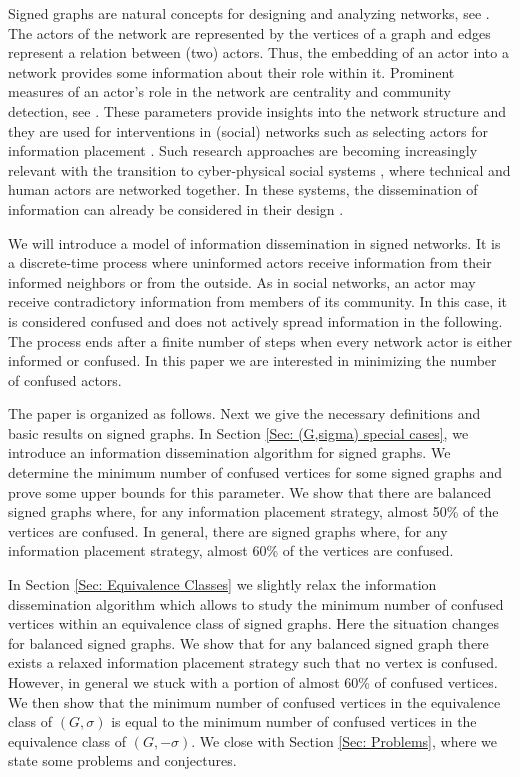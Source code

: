 \documentclass[a4paper,11pt]{article}
\theoremstyle{remark}
\begin{document}
Signed graphs are natural concepts for designing and analyzing networks, see \cite{leskovec2010signed}. 
The actors of the network are represented by the vertices of a graph and 
edges represent a relation between (two) actors. Thus, the embedding of an actor into a network provides some information about their role within it.
Prominent measures of an actor's role in the network are centrality and community detection, see \cite{bloch2023centrality, liu2020simple, sun2020stable}.
These parameters provide insights into the network structure and they are used for 
interventions in (social) networks such as selecting actors 
for information placement \cite{intervensions}. Such research approaches 
are becoming increasingly relevant with the transition to cyber-physical social systems \cite{zhou2019cyber}, where technical and human actors are networked together. 
In these systems, the dissemination of information can
already be considered in their design \cite{dressler2018cyber}. 

We will introduce a model of information dissemination in signed networks. It is a discrete-time process where uninformed actors receive information from their informed neighbors or from the outside. As in social networks, an actor may receive contradictory information from members of its community. In this case, it is considered confused and does not actively spread information in the following. The process ends after a finite number of steps when every network actor is either informed or confused. In this paper we are interested in minimizing the number of confused actors. 

The paper is organized as follows. 
Next we give the necessary definitions and basic results on signed graphs.
In Section \ref{Sec: (G,sigma) special cases}, we introduce an information dissemination algorithm for signed graphs. We determine the minimum number of confused vertices for some signed graphs 
and prove some upper bounds for this parameter. We show that there are balanced 
signed graphs where, for any information placement strategy, almost 50\% 
of the vertices are confused. In general, there are 
signed graphs where, for any information placement strategy, almost 
60\% of the vertices are confused. 
 
In Section \ref{Sec: Equivalence Classes}
we slightly relax the information dissemination algorithm which allows to study 
the minimum number of confused vertices within an equivalence class of signed graphs.
Here the situation changes for balanced signed graphs. We show that for any balanced
signed graph there exists a relaxed information placement strategy such that no vertex is confused. However, in general we stuck with a portion of almost 60\% of confused vertices. 
We then show that the minimum number of confused vertices in the equivalence class of $(G,\sigma)$
is equal to the minimum number of confused vertices in the equivalence class of $(G,-\sigma)$. 
We close with Section \ref{Sec: Problems}, where we state some problems and conjectures.
\end{document}

